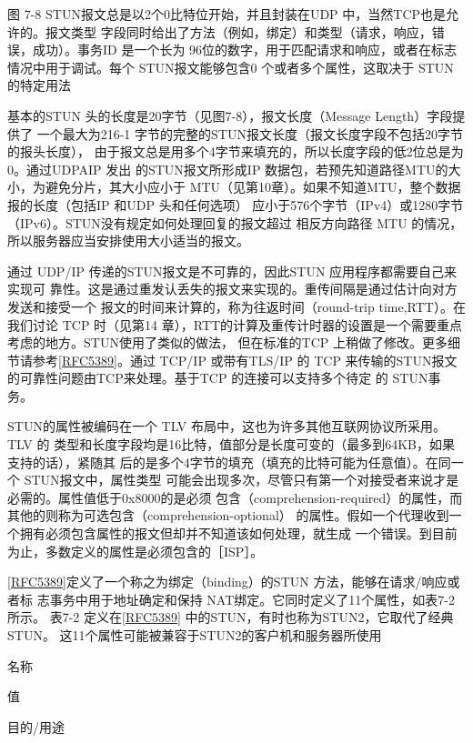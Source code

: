 图 7-8
STUN报文总是以2个0比特位开始，并且封装在UDP 中，当然TCP也是允许的。报文类型
字段同时给出了方法（例如，绑定）和类型（请求，响应，错误，成功）。事务ID 是一个长为
96位的数字，用于匹配请求和响应，或者在标志情况中用于调试。每个 STUN报文能够包含0
个或者多个属性，这取决于 STUN 的特定用法

基本的STUN 头的长度是20字节（见图7-8），报文长度（Message Length）字段提供了
一个最大为216-1 字节的完整的STUN报文长度（报文长度字段不包括20字节的报头长度），
由于报文总是用多个4字节来填充的，所以长度字段的低2位总是为0。通过UDPAIP 发出
的STUN报文所形成IP 数据包，若预先知道路径MTU的大小，为避免分片，其大小应小于
MTU（见第10章）。如果不知道MTU，整个数据报的长度（包括IP 和UDP 头和任何选项）
应小于576个字节（IPv4）或1280字节（IPv6）。STUN没有规定如何处理回复的报文超过
相反方向路径 MTU 的情况，所以服务器应当安排使用大小适当的报文。

通过 UDP/IP 传递的STUN报文是不可靠的，因此STUN 应用程序都需要自己来实现可
靠性。这是通过重发认丢失的报文来实现的。重传间隔是通过估计向对方发送和接受一个
报文的时间来计算的，称为往返时间（round-trip time,RTT）。在我们讨论 TCP 时（见第14
章），RTT的计算及重传计时器的设置是一个需要重点考虑的地方。STUN使用了类似的做法，
但在标准的TCP
上稍做了修改。更多细节请参考\href{https://www.rfc-editor.org/rfc/rfc5389}{[RFC5389]}。通过
TCP/IP 或带有TLS/IP 的
TCP 来传输的STUN报文的可靠性问题由TCP来处理。基于TCP 的连接可以支持多个待定
的 STUN事务。

STUN的属性被编码在一个 TLV 布局中，这也为许多其他互联网协议所采用。TLV 的
类型和长度字段均是16比特，值部分是长度可变的（最多到64KB，如果支持的话），紧随其
后的是多个4字节的填充（填充的比特可能为任意值）。在同一个 STUN报文中，属性类型
可能会出现多次，尽管只有第一个对接受者来说才是必需的。属性值低于0x8000的是必须
包含（comprehension-required）的属性，而其他的则称为可选包含（comprehension-optional）
的属性。假如一个代理收到一个拥有必须包含属性的报文但却并不知道该如何处理，就生成
一个错误。到目前为止，多数定义的属性是必须包含的［ISP］。

\href{https://www.rfc-editor.org/rfc/rfc5389}{[RFC5389]}定义了一个称之为绑定（binding）的STUN
方法，能够在请求/响应或者标
志事务中用于地址确定和保持 NAT绑定。它同时定义了11个属性，如表7-2所示。
表7-2 定义在\href{https://www.rfc-editor.org/rfc/rfc5389}{[RFC5389]}
中的STUN，有时也称为STUN2，它取代了经典 STUN。
这11个属性可能被兼容于STUN2的客户机和服务器所使用

名称

值

目的/用途

